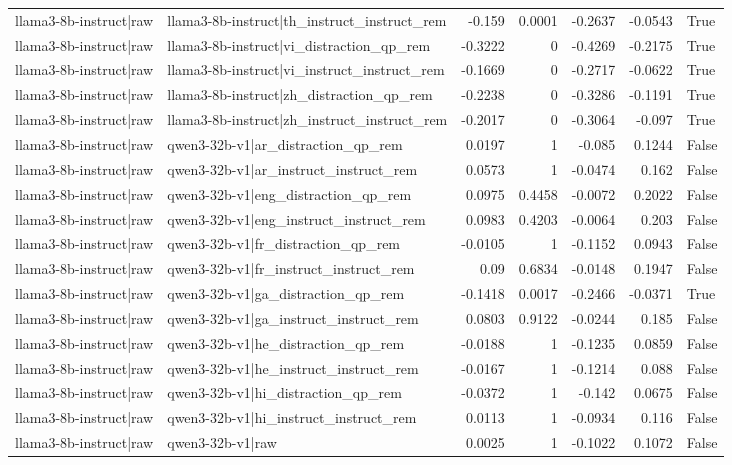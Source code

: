\begin{table}
\begin{tabular}{l l r r r r l}
llama3-8b-instruct|raw & llama3-8b-instruct|th_instruct_instruct_rem & -0.159 & 0.0001 & -0.2637 & -0.0543 & True \\
llama3-8b-instruct|raw & llama3-8b-instruct|vi_distraction_qp_rem & -0.3222 & 0 & -0.4269 & -0.2175 & True \\
llama3-8b-instruct|raw & llama3-8b-instruct|vi_instruct_instruct_rem & -0.1669 & 0 & -0.2717 & -0.0622 & True \\
llama3-8b-instruct|raw & llama3-8b-instruct|zh_distraction_qp_rem & -0.2238 & 0 & -0.3286 & -0.1191 & True \\
llama3-8b-instruct|raw & llama3-8b-instruct|zh_instruct_instruct_rem & -0.2017 & 0 & -0.3064 & -0.097 & True \\
llama3-8b-instruct|raw & qwen3-32b-v1|ar_distraction_qp_rem & 0.0197 & 1 & -0.085 & 0.1244 & False \\
llama3-8b-instruct|raw & qwen3-32b-v1|ar_instruct_instruct_rem & 0.0573 & 1 & -0.0474 & 0.162 & False \\
llama3-8b-instruct|raw & qwen3-32b-v1|eng_distraction_qp_rem & 0.0975 & 0.4458 & -0.0072 & 0.2022 & False \\
llama3-8b-instruct|raw & qwen3-32b-v1|eng_instruct_instruct_rem & 0.0983 & 0.4203 & -0.0064 & 0.203 & False \\
llama3-8b-instruct|raw & qwen3-32b-v1|fr_distraction_qp_rem & -0.0105 & 1 & -0.1152 & 0.0943 & False \\
llama3-8b-instruct|raw & qwen3-32b-v1|fr_instruct_instruct_rem & 0.09 & 0.6834 & -0.0148 & 0.1947 & False \\
llama3-8b-instruct|raw & qwen3-32b-v1|ga_distraction_qp_rem & -0.1418 & 0.0017 & -0.2466 & -0.0371 & True \\
llama3-8b-instruct|raw & qwen3-32b-v1|ga_instruct_instruct_rem & 0.0803 & 0.9122 & -0.0244 & 0.185 & False \\
llama3-8b-instruct|raw & qwen3-32b-v1|he_distraction_qp_rem & -0.0188 & 1 & -0.1235 & 0.0859 & False \\
llama3-8b-instruct|raw & qwen3-32b-v1|he_instruct_instruct_rem & -0.0167 & 1 & -0.1214 & 0.088 & False \\
llama3-8b-instruct|raw & qwen3-32b-v1|hi_distraction_qp_rem & -0.0372 & 1 & -0.142 & 0.0675 & False \\
llama3-8b-instruct|raw & qwen3-32b-v1|hi_instruct_instruct_rem & 0.0113 & 1 & -0.0934 & 0.116 & False \\
llama3-8b-instruct|raw & qwen3-32b-v1|raw & 0.0025 & 1 & -0.1022 & 0.1072 & False \\

\end{tabular}
\end{table}
